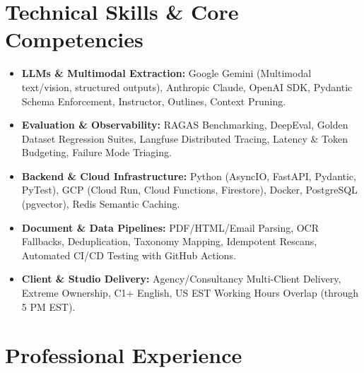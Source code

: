 \documentclass[a4paper,10pt]{article}
\begin{document}
\section{Technical Skills \& Core Competencies}
\begin{itemize}[leftmargin=1.2em, itemsep=2pt]
  \item \textbf{LLMs \& Multimodal Extraction:} Google Gemini (Multimodal text/vision, structured outputs), Anthropic Claude, OpenAI SDK, Pydantic Schema Enforcement, Instructor, Outlines, Context Pruning.
  \item \textbf{Evaluation \& Observability:} RAGAS Benchmarking, DeepEval, Golden Dataset Regression Suites, Langfuse Distributed Tracing, Latency \& Token Budgeting, Failure Mode Triaging.
  \item \textbf{Backend \& Cloud Infrastructure:} Python (AsyncIO, FastAPI, Pydantic, PyTest), GCP (Cloud Run, Cloud Functions, Firestore), Docker, PostgreSQL (pgvector), Redis Semantic Caching.
  \item \textbf{Document \& Data Pipelines:} PDF/HTML/Email Parsing, OCR Fallbacks, Deduplication, Taxonomy Mapping, Idempotent Rescans, Automated CI/CD Testing with GitHub Actions.
  \item \textbf{Client \& Studio Delivery:} Agency/Consultancy Multi-Client Delivery, Extreme Ownership, C1+ English, US EST Working Hours Overlap (through 5 PM EST).
\end{itemize}

\section{Professional Experience}
\end{document}
